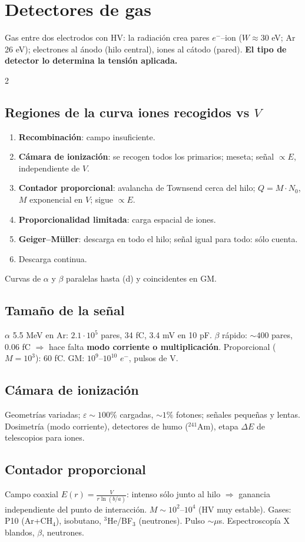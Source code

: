 \documentclass[10pt,a4paper]{article}
\newcommand{\imp}[1]{\textbf{\color{BrickRed}#1}}
\begin{document}
\section{Detectores de gas}
\begin{clave}[Principio]
Gas entre dos electrodos con HV: la radiación crea pares $e^-$--ion ($W\approx30$ eV; Ar 26 eV); electrones al ánodo (hilo central), iones al cátodo (pared).
\textbf{El tipo de detector lo determina la tensión aplicada.}
\end{clave}
\begin{multicols}{2}
\subsection{Regiones de la curva iones recogidos vs $V$}
\begin{enumerate}[label=(\alph*)]
\item \textbf{Recombinación}: campo insuficiente.
\item \imp{Cámara de ionización}: se recogen todos los primarios; meseta; señal $\propto E$, independiente de $V$.
\item \imp{Contador proporcional}: avalancha de Townsend cerca del hilo; $Q=M\cdot N_0$, $M$ exponencial en $V$; sigue $\propto E$.
\item \textbf{Proporcionalidad limitada}: carga espacial de iones.
\item \imp{Geiger--Müller}: descarga en todo el hilo; señal igual para todo: sólo cuenta.
\item Descarga continua.
\end{enumerate}
Curvas de $\alpha$ y $\beta$ paralelas hasta (d) y coincidentes en GM.
\subsection{Tamaño de la señal}
$\alpha$ 5.5 MeV en Ar: $2.1\cdot10^5$ pares, 34 fC, 3.4 mV en 10 pF. $\beta$ rápido: $\sim400$ pares, 0.06 fC $\Rightarrow$ hace falta \textbf{modo corriente o multiplicación}.
Proporcional ($M=10^3$): 60 fC. GM: $10^9$--$10^{10}$ $e^-$, pulsos de V.
\subsection{Cámara de ionización}
Geometrías variadas; $\varepsilon\sim100\%$ cargadas, $\sim1\%$ fotones; señales pequeñas y lentas. Dosimetría (modo corriente), detectores de humo ($^{241}$Am), etapa $\Delta E$ de telescopios para iones.
\columnbreak
\subsection{Contador proporcional}
Campo coaxial $E(r)=\frac{V}{r\ln(b/a)}$: intenso sólo junto al hilo $\Rightarrow$ ganancia independiente del punto de interacción.
$M\sim10^2$--$10^4$ (HV muy estable). Gases: P10 (Ar+CH$_4$), isobutano, $^3$He/BF$_3$ (neutrones). Pulso $\sim\mu$s. Espectroscopía X blandos, $\beta$, neutrones.

\end{multicols}
\end{document}
